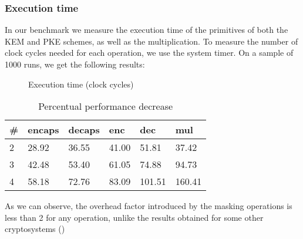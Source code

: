 \subsubsection*{\textbf{Execution time}}
In our benchmark we measure the execution time of the primitives of both the KEM and PKE schemes, as well as the multiplication.
To measure the number of clock cycles needed for each operation, we use the system timer. On a sample of 1000 runs, we get the following results:
\begin{figure}[H]
    \centering
\caption{Execution time (clock cycles)}
\end{figure}
\begin{table}[H]
    \begin{tabular}{llllll}
        \# & encaps & decaps & enc & dec & mul \\ \hline
        2 & 28.92 & 36.55 & 41.00 & 51.81 & 37.42 \\
        3 & 42.48 & 53.40 & 61.05 & 74.88 & 94.73 \\
        4 & 58.18 & 72.76 & 83.09 & 101.51 & 160.41
    \end{tabular}
    \caption{Percentual performance decrease}
\end{table}
As we can observe, the overhead factor introduced by the masking operations is less than 2 for any operation, 
unlike the results obtained for some other cryptosystems (\cite{belaid:hal-02953167,cryptoeprint:2020:733,cryptoeprint:2021:483})

